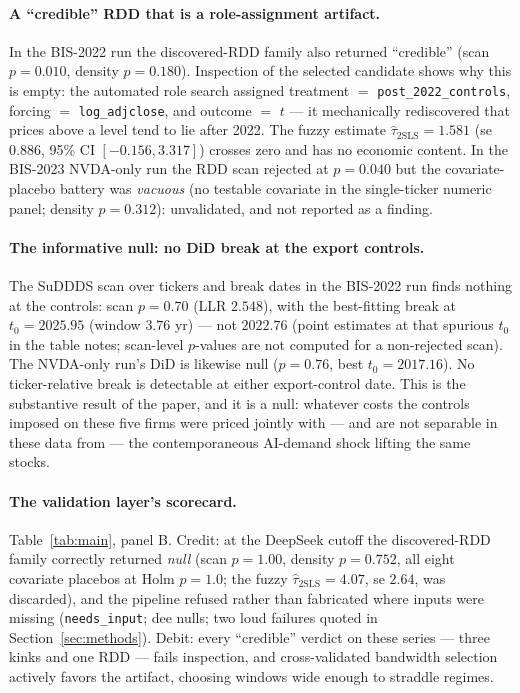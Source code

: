 \documentclass[11pt]{article}
\begin{document}
\paragraph{A ``credible'' RDD that is a role-assignment artifact.} In the
BIS-2022 run the discovered-RDD family also returned ``credible'' (scan
$p = 0.010$, density $p = 0.180$). Inspection of the selected candidate
shows why this is empty: the automated role search assigned
treatment $=$ \texttt{post\_2022\_controls}, forcing $=$
\texttt{log\_adjclose}, and outcome $=$ $t$ --- it mechanically rediscovered
that prices above a level tend to lie after 2022. The fuzzy estimate
$\hat\tau_{\mathrm{2SLS}} = 1.581$ (se $0.886$, 95\% CI $[-0.156, 3.317]$)
crosses zero and has no economic content. In the BIS-2023 NVDA-only run the
RDD scan rejected at $p = 0.040$ but the covariate-placebo battery was
\emph{vacuous} (no testable covariate in the single-ticker numeric panel;
density $p = 0.312$): unvalidated, and not reported as a finding.

\paragraph{The informative null: no DiD break at the export controls.} The
SuDDDS scan over tickers and break dates in the BIS-2022 run finds nothing at
the controls: scan $p = 0.70$ (LLR $2.548$), with the best-fitting break at
$t_0 = 2025.95$ (window $3.76$ yr) --- not $2022.76$ (point estimates at that
spurious $t_0$ in the table notes; scan-level $p$-values are not computed for
a non-rejected scan). The NVDA-only run's DiD is likewise null ($p = 0.76$,
best $t_0 = 2017.16$). No ticker-relative break is detectable at either
export-control date. This is the substantive result of the paper, and it is
a null: whatever costs the controls imposed on these five firms were priced
jointly with --- and are not separable in these data from --- the
contemporaneous AI-demand shock lifting the same stocks.

\paragraph{The validation layer's scorecard.} Table~\ref{tab:main}, panel B.
Credit: at the DeepSeek cutoff the discovered-RDD family correctly returned
\emph{null} (scan $p = 1.00$, density $p = 0.752$, all eight covariate
placebos at Holm $p = 1.0$; the fuzzy $\hat\tau_{\mathrm{2SLS}} = 4.07$, se
$2.64$, was discarded), and the pipeline refused rather than fabricated
where inputs were missing (\texttt{needs\_input}; dee nulls; two loud
failures quoted in Section~\ref{sec:methods}). Debit: every ``credible''
verdict on these series --- three kinks and one RDD --- fails inspection,
and cross-validated bandwidth selection actively favors the artifact,
choosing windows wide enough to straddle regimes.
\end{document}
